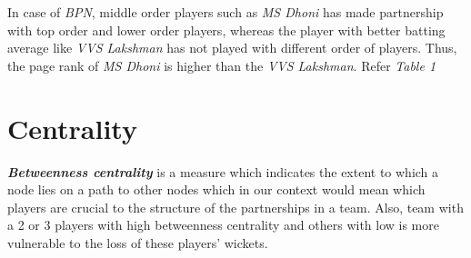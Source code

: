 \documentclass{article}
\begin{document}
In case of \textit{BPN}, middle order players such as \textit{MS Dhoni} has made partnership with top order and lower order players, whereas the player with better batting average like \textit{VVS Lakshman} has not played with different order of players. Thus, the page rank of \textit{MS Dhoni} is higher than the \textit{VVS Lakshman}. 
Refer \textit{Table 1}
\begin{table}[!h]
\end{table}

\section{Centrality}
\textbf{\textit{Betweenness centrality}} is a measure which indicates the extent to which a node lies on a path to other nodes which in our context would mean which players are crucial to the structure of the partnerships in a team. Also, team with a 2 or 3 players with high betweenness centrality and others with low is more vulnerable to the loss of these players' wickets.
\end{document}
